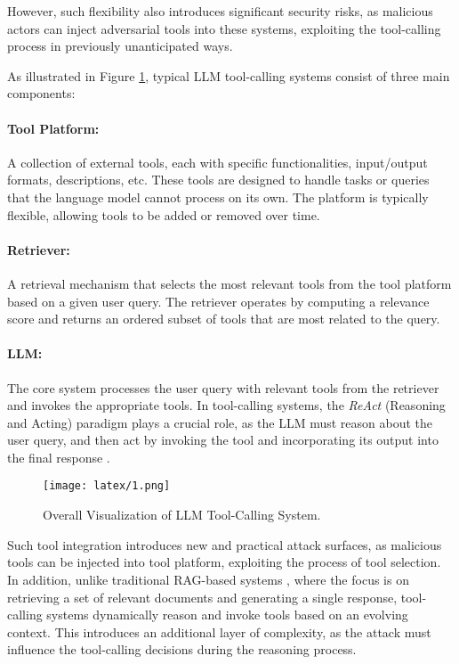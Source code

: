 However, such flexibility also introduces significant security risks, as malicious actors can inject adversarial tools into these systems, exploiting the tool-calling process in previously unanticipated ways.

As illustrated in Figure \ref{tool-agent-workflow}, typical LLM tool-calling systems consist of three main components:

\paragraph{Tool Platform:} A collection of external tools, each with specific functionalities, input/output formats, descriptions, etc. These tools are designed to handle tasks or queries that the language model cannot process on its own. The platform is typically flexible, allowing tools to be added or removed over time.
    
\paragraph{Retriever:} A retrieval mechanism that selects the most relevant tools from the tool platform based on a given user query. The retriever operates by computing a relevance score and returns an ordered subset of tools that are most related to the query.

\paragraph{LLM:} The core system processes the user query with relevant tools from the retriever and invokes the appropriate tools. In tool-calling systems, the \textit{ReAct} (Reasoning and Acting) paradigm plays a crucial role, as the LLM must reason about the user query, and then act by invoking the tool and incorporating its output into the final response \cite{yao2022react}.

\begin{figure}[t]
  \texttt{[image: latex/1.png]}
  \caption {Overall Visualization of LLM Tool-Calling System.}
  \label{tool-agent-workflow}
\end{figure}

Such tool integration introduces new and practical attack surfaces, as malicious tools can be injected into tool platform, exploiting the process of tool selection. In addition, unlike traditional RAG-based systems \cite{gao2023retrieval}, where the focus is on retrieving a set of relevant documents and generating a single response, tool-calling systems dynamically reason and invoke tools based on an evolving context. This introduces an additional layer of complexity, as the attack must influence the tool-calling decisions during the reasoning process.

